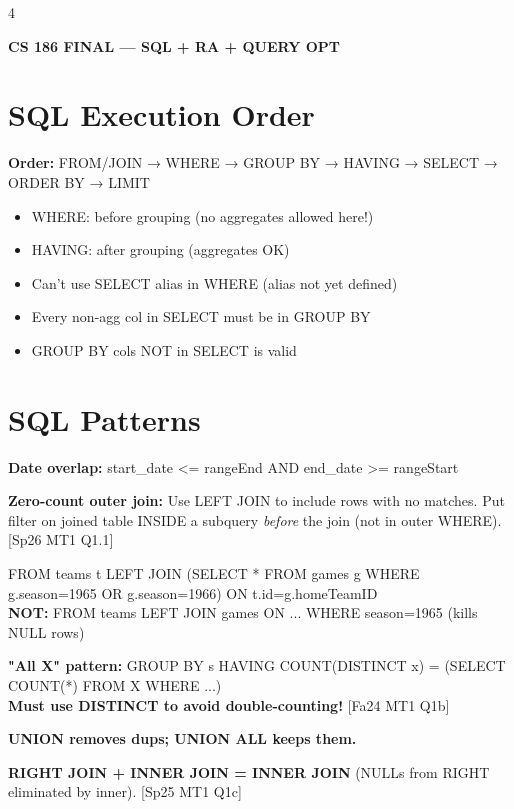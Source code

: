 \documentclass[8pt,letterpaper]{article}
\newcommand{\tinyfont}{\fontsize{4.8}{5.5}\selectfont}
\newcommand{\titlefont}{\fontsize{6.5}{7.5}\selectfont}
\newcommand{\codefont}{\fontsize{4.2}{4.8}\selectfont\ttfamily}
\newcommand{\key}[1]{\textbf{\color{red!70!black}#1}}
\newcommand{\warn}[1]{\textbf{\color{orange!85!black}#1}}
\newcommand{\sql}[1]{{\codefont #1}}
\newcommand{\qref}[1]{{\fontsize{3.5}{4}\selectfont\color{purple!60!black}[#1]}}
\begin{document}
\tinyfont
\begin{multicols*}{4}
\centerline{\titlefont\textbf{\color{purple!80!black}CS 186 FINAL — SQL + RA + QUERY OPT}}
\vspace{1pt}

\section{SQL Execution Order}
\key{Order:} FROM/JOIN → WHERE → GROUP BY → HAVING → SELECT → ORDER BY → LIMIT
\begin{itemize}
  \item WHERE: before grouping (no aggregates allowed here!)
  \item HAVING: after grouping (aggregates OK)
  \item Can't use SELECT alias in WHERE (alias not yet defined)
  \item Every non-agg col in SELECT must be in GROUP BY
  \item GROUP BY cols NOT in SELECT is valid
\end{itemize}

\section{SQL Patterns}
\key{Date overlap:} \sql{start\_date <= rangeEnd AND end\_date >= rangeStart}

\key{Zero-count outer join:} Use LEFT JOIN to include rows with no matches. Put filter on joined table INSIDE a subquery \emph{before} the join (not in outer WHERE). \qref{Sp26 MT1 Q1.1}
\begin{ansbox}
\sql{FROM teams t LEFT JOIN (SELECT * FROM games g WHERE g.season=1965 OR g.season=1966) ON t.id=g.homeTeamID}\\
\warn{NOT:} \sql{FROM teams LEFT JOIN games ON ... WHERE season=1965} (kills NULL rows)
\end{ansbox}

\key{"All X" pattern:}
\sql{GROUP BY s HAVING COUNT(DISTINCT x) = (SELECT COUNT(*) FROM X WHERE ...)}\\
\warn{Must use DISTINCT to avoid double-counting!} \qref{Fa24 MT1 Q1b}

\key{UNION removes dups; UNION ALL keeps them.}

\key{RIGHT JOIN + INNER JOIN = INNER JOIN} (NULLs from RIGHT eliminated by inner). \qref{Sp25 MT1 Q1c}


\end{multicols*}
\end{document}
